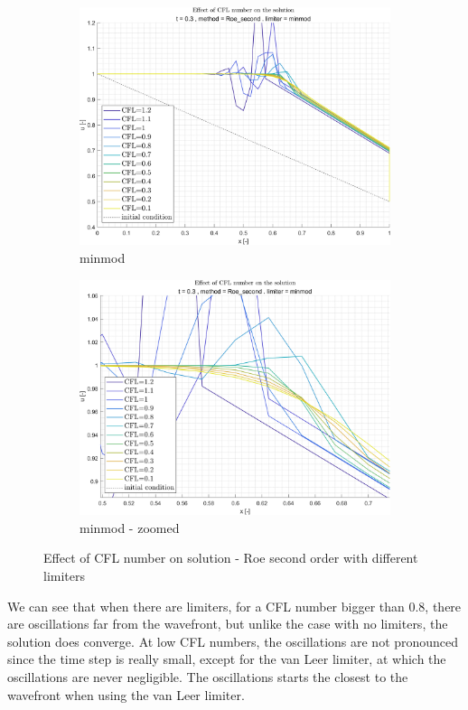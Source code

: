 \documentclass[11pt, a4paper]{article}
\begin{document}
\begin{figure}[H]
\begin{subfigure}[c]{.35\textwidth}
        \includegraphics[width=\textwidth]{images/grap6.png}
        \caption{minmod}
        \label{fig:roe_second_minmod_A}
    \end{subfigure}
    \begin{subfigure}[c]{.35\textwidth}
        \centering
        \includegraphics[width=\textwidth]{images/grap6.1.png}
        \caption{minmod - zoomed}
        \label{fig:roe_second_minmod_B}
    \end{subfigure}
    \caption{Effect of CFL number on solution - Roe second order with different limiters}
    \label{fig:roe_second_with_limiters}
\end{figure}
\noindent We can see that when there are limiters, for a CFL number bigger than 0.8, there are oscillations far from the wavefront, but unlike the case with no limiters, the solution does converge. At low CFL numbers, the oscillations are not pronounced since the time step is really small, except for the van Leer limiter, at which the oscillations are never negligible. The oscillations starts the closest to the wavefront when using the van Leer limiter. 
\end{document}
